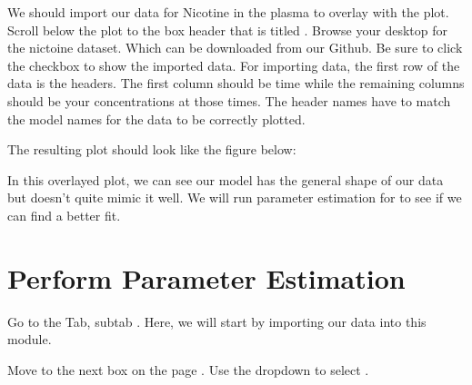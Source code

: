 \documentclass[letterpaper,10pt,english]{sphinxmanual}
\begin{document}
\sphinxAtStartPar
We should import our data for Nicotine in the plasma to overlay with the plot.
Scroll below the plot to the box header that is titled .
Browse your desktop for the nictoine dataset.  Which can be downloaded from
our Github. Be sure to click the  checkbox to show the imported
data. For importing data, the first row of the data is the headers. The first
column should be time while the remaining columns should be your concentrations
at those times. The header names have to match the model names for the data to
be correctly plotted.

\begin{figure}[htbp]
\centering

\noindent{}
\end{figure}

\sphinxAtStartPar
The resulting plot should look like the figure below:

\begin{figure}[htbp]
\centering

\noindent{}
\end{figure}

\sphinxAtStartPar
In this overlayed plot, we can see our model has the general shape of our data
but doesn’t quite mimic it well. We will run parameter estimation for  to
see if we can find a better fit.


\section{Perform Parameter Estimation}
\label{\detokenize{pages/tutorial_par_estimation:perform-parameter-estimation}}
\sphinxAtStartPar
Go to the  Tab, subtab . Here, we
will start by importing our data into this module.

\begin{figure}[htbp]
\centering

\noindent{}
\end{figure}

\sphinxAtStartPar
Move to the next box on the page . Use the dropdown to
select .

\begin{figure}[htbp]
\centering

\noindent{}
\end{figure}
\end{document}
